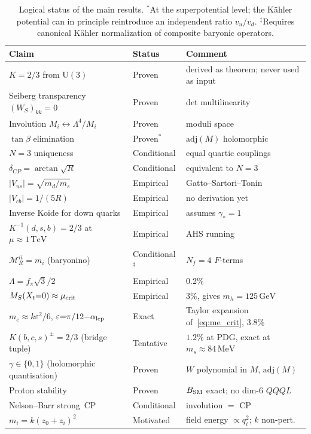 \documentclass[12pt,a4paper]{article}
\newcommand{\UU}{\mathrm{U}}
\newcommand{\Nf}{N_f}
\newcommand{\adj}{\mathrm{adj}}
\newcommand{\MeV}{\,\mathrm{MeV}}
\newcommand{\GeV}{\,\mathrm{GeV}}
\newcommand{\TeV}{\,\mathrm{TeV}}
\begin{document}
\begin{table}[ht]
\centering\small
\begin{tabular}{lll}
\hline
Claim & Status & Comment \\
\hline
$K = 2/3$ from $\UU(3)$ & Proven & derived as theorem; never used as input \\
Seiberg transparency $(W_S)_{kk} = 0$ & Proven & det multilinearity \\
Involution $M_i \leftrightarrow \Lambda^4/M_i$ & Proven & moduli space \\
$\tan\beta$ elimination & Proven${}^*$ & $\adj(M)$ holomorphic \\
$N = 3$ uniqueness & Conditional & equal quartic couplings \\
$\delta_{CP} = \arctan\!\sqrt{R}$ & Conditional & equivalent to $N{=}3$ \\
$|V_{us}| = \sqrt{m_d/m_s}$ & Empirical & Gatto--Sartori--Tonin~\cite{GattoSartoriTonin:1968} \\
$|V_{cb}| = 1/(5R)$ & Empirical & no derivation yet \\
Inverse Koide for down quarks & Empirical & assumes $\gamma_* = 1$ \\
$K^{-1}(d,s,b) = 2/3$ at $\mu\!\approx\!1\TeV$ & Empirical & AHS running~\cite{AntuschHinzeSaad:2025} \\
$\mathcal{M}_R^{ii} = m_i$ (baryonino) & Conditional${}^\ddagger$ & $\Nf{=}4$ $F$-terms \\
$\Lambda = f_\pi\sqrt{3}/2$ & Empirical & 0.2\% \\
$M_S(X_t{=}0) \approx \mu_{\rm crit}$ & Empirical & 3\%, gives $m_h{=}125\GeV$ \\
$m_e \approx k\varepsilon^2/6$, $\varepsilon{=}\pi/12{-}\alpha_{\rm lep}$ & Exact & Taylor expansion of~\eqref{eq:me_crit}, 3.8\% \\
$K(b,c,s)^{\pm} = 2/3$ (bridge tuple) & Tentative & $1.2\%$ at PDG, exact at $m_s \approx 84\MeV$ \\
$\gamma \in \{0,1\}$ (holomorphic quantisation) & Proven & $W$ polynomial in $M$, $\adj(M)$ \\
Proton stability & Proven & $B_{\rm SM}$ exact; no dim-6 $QQQL$ \\
Nelson--Barr strong~CP & Conditional & involution $=$ CP \\
$m_i = k(z_0{+}z_i)^2$ & Motivated & field energy $\propto q_i^2$; $k$ non-pert. \\
\hline
\end{tabular}
\caption{Logical status of the main results.
${}^*$At the superpotential level; the K\"ahler potential
  can in principle reintroduce an independent ratio
  $v_u/v_d$.
${}^\ddagger$Requires canonical K\"ahler normalization
  of composite baryonic operators.}
\label{tab:status}
\end{table}
\end{document}
